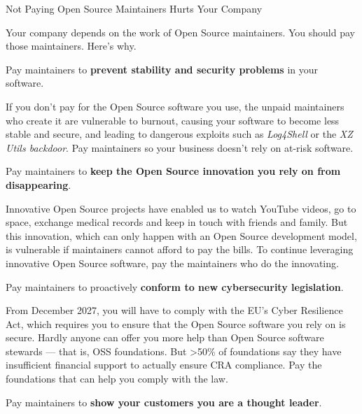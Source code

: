 \begin{multicols}{2}
\vspace{3mm}
{\renewcommand{\baselinestretch}{0.9}\Huge\raggedright Not Paying Open Source Maintainers Hurts Your Company\par}

Your company depends on the work of Open Source maintainers. You should pay those maintainers. Here's why.

\vspace{3mm}

 Pay maintainers to \textbf{prevent stability and security problems} in your software.

If you don't pay for the Open Source software you use, the unpaid maintainers who create it are vulnerable to burnout,
causing your software to become less stable and secure, and leading to dangerous exploits such as \textit{Log4Shell}
or the \textit{XZ Utils backdoor}. Pay maintainers so your business doesn't rely on at-risk software.

\vspace{3mm}

 Pay maintainers to \textbf{keep the Open Source innovation you rely on from disappearing}.

Innovative Open Source projects have enabled us to watch YouTube videos, go to space, exchange medical records and keep
in touch with friends and family. But this innovation, which can only happen with an Open Source development model, is
vulnerable if maintainers cannot afford to pay the bills. To continue leveraging innovative Open Source software, pay
the maintainers who do the innovating.

\vspace{3mm}

 Pay maintainers to proactively \textbf{conform to new cybersecurity legislation}.

From December 2027, you will have to comply with the EU's Cyber Resilience Act, which requires you to ensure that the
Open Source software you rely on is secure. Hardly anyone can offer you more help than Open Source software stewards —
that is, OSS foundations. But >50\% of foundations say they have insufficient financial support to actually ensure
CRA compliance. Pay the foundations that can help you comply with the law.

\vspace{3mm}

 Pay maintainers to \textbf{show your customers you are a thought leader}.


\end{multicols}
